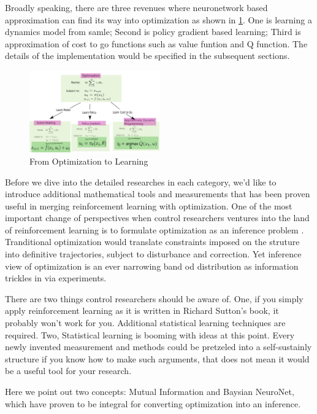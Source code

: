 \documentclass[journal]{IEEEtran}
\begin{document}
Broadly speaking, there are three revenues where neuronetwork based approximation can find its way into optimization as shown in \ref{fig:1}. One is learning a dynamics model from samle; Second is policy gradient based learning; Third is approximation of cost to go functions such as value funtion and Q function. The details of the implementation would be specified in the subsequent sections.

\begin{figure}[H]
    \centering
    \includegraphics[width=0.5\textwidth]{Control.png}
    \caption{From Optimization to Learning}
    \label{fig:1}
\end{figure}

Before we dive into the detailed researches in each category, we'd like to introduce additional mathematical tools and measurements that has been proven useful in merging reinforcement learning with optimization. One of the most important change of perspectives when control researchers ventures into the land of reinforcement learning is to formulate optimization as an inference problem \cite{Levine2018ReinforcementLA}. Tranditional optimization would translate constraints imposed on the struture into definitive trajectories, subject to disturbance and correction. Yet inference view of optimization is an ever narrowing band od distribution as information trickles in via experiments.

There are two things control researchers should be aware of. One, if you simply apply reinforcement learning as it is written in Richard Sutton's book, it probably won't work for you. Additional statistical learning techniques are required. Two, Statistical learning is booming with ideas at this point. Every newly invented measurement and methods could be pretzeled into a self-sustainly structure if you know how to make such arguments, that does not mean it would be a useful tool for your research.

Here we point out two concepts: Mutual Information and Baysian NeuroNet, which have proven to be integral for converting optimization into an inference.
\end{document}
